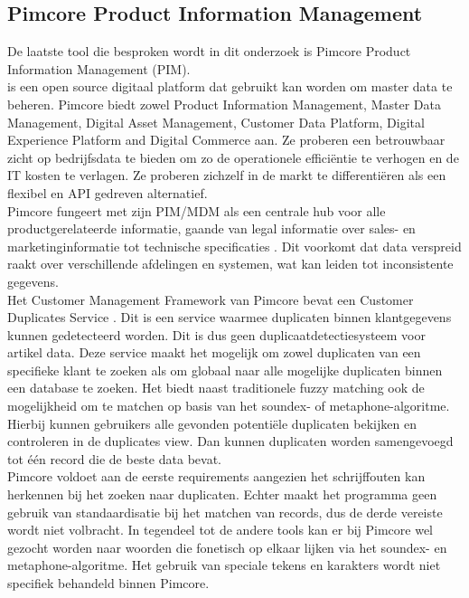 \subsection{Pimcore Product Information Management}
De laatste tool die besproken wordt in dit onderzoek is Pimcore Product Information Management (PIM). 
\\ \textcite{Pimcore} is een open source digitaal platform dat gebruikt kan worden om master data te beheren. Pimcore biedt zowel Product Information Management, Master Data Management, Digital Asset Management, Customer Data Platform, Digital Experience Platform and Digital Commerce aan. Ze proberen een betrouwbaar zicht op bedrijfsdata te bieden om zo de operationele efficiëntie te verhogen en de IT kosten te verlagen. Ze proberen zichzelf in de markt te differentiëren als een flexibel en API gedreven alternatief. 
\\Pimcore fungeert met zijn PIM/MDM als een centrale hub voor alle productgerelateerde informatie, gaande van legal informatie over sales- en marketinginformatie tot technische specificaties \autocite{StudioEmma}. Dit voorkomt dat data verspreid raakt over verschillende afdelingen en systemen, wat kan leiden tot inconsistente gegevens.
\\Het Customer Management Framework van Pimcore bevat een Customer Duplicates Service \autocite{Pimcore2024}. Dit is een service waarmee duplicaten binnen klantgegevens kunnen gedetecteerd worden. Dit is dus geen duplicaatdetectiesysteem voor artikel data. Deze service maakt het mogelijk om zowel duplicaten van een specifieke klant te zoeken als om globaal naar alle mogelijke duplicaten binnen een database te zoeken. Het biedt naast traditionele fuzzy matching ook de mogelijkheid om te matchen op basis van het soundex- of metaphone-algoritme. Hierbij kunnen gebruikers alle gevonden potentiële duplicaten bekijken en controleren in de duplicates view. Dan kunnen duplicaten worden samengevoegd tot één record die de beste data bevat.
\\Pimcore voldoet aan de eerste requirements aangezien het schrijffouten kan herkennen bij het zoeken naar duplicaten. Echter maakt het programma geen gebruik van standaardisatie bij het matchen van records, dus de derde vereiste wordt niet volbracht. In tegendeel tot de andere tools kan er bij Pimcore wel gezocht worden naar woorden die fonetisch op elkaar lijken via het soundex- en metaphone-algoritme. Het gebruik van speciale tekens en karakters wordt niet specifiek behandeld binnen Pimcore.
